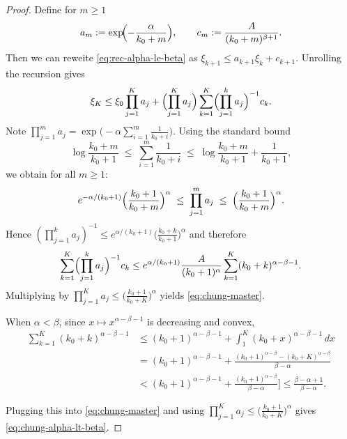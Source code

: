     \begin{proof}
    Define for $m\ge 1$
    \[
    a_m:=\exp\!\Bigl(-\frac{\alpha}{k_0+m}\Bigr),
    \qquad
    c_m:=\frac{A}{(k_0+m)^{\beta+1}}.
    \]
    Then we can reweite \eqref{eq:rec-alpha-le-beta} as $\xi_{k+1}\le a_{k+1}\xi_k+c_{k+1}$.
    Unrolling the recursion gives
    \[
    \xi_K
    \le
    \xi_0\prod_{j=1}^K a_j
    +
    \Bigl(\prod_{j=1}^K a_j\Bigr)\sum_{k=1}^K
    \Bigl(\prod_{j=1}^k a_j\Bigr)^{-1}c_k.
    \]
    Note $\prod_{j=1}^m a_j=\exp\!\bigl(-\alpha\sum_{i=1}^m\frac{1}{k_0+i}\bigr)$. Using the standard bound
    \[
    \log\frac{k_0+m}{k_0+1}
    \;\le\;
    \sum_{i=1}^m\frac{1}{k_0+i}
    \;\le\;
    \log\frac{k_0+m}{k_0+1}+\frac{1}{k_0+1},
    \]
    we obtain for all $m\ge 1$:
    \[
    e^{-\alpha/(k_0+1)}\Bigl(\frac{k_0+1}{k_0+m}\Bigr)^{\alpha}
    \;\le\;
    \prod_{j=1}^m a_j
    \;\le\;
    \Bigl(\frac{k_0+1}{k_0+m}\Bigr)^{\alpha}.
    \]
    Hence $(\prod_{j=1}^k a_j)^{-1}\le e^{\alpha/(k_0+1)}\bigl(\frac{k_0+k}{k_0+1}\bigr)^{\alpha}$ and therefore
    \[
    \sum_{k=1}^K\Bigl(\prod_{j=1}^k a_j\Bigr)^{-1}c_k
    \le
    e^{\alpha/(k_0+1)}\frac{A}{(k_0+1)^{\alpha}}
    \sum_{k=1}^K (k_0+k)^{\alpha-\beta-1}.
    \]
    Multiplying by $\prod_{j=1}^K a_j\le \bigl(\frac{k_0+1}{k_0+K}\bigr)^{\alpha}$ yields \eqref{eq:chung-master}.
    
    
    
    When $\alpha<\beta$, since $x\mapsto x^{\alpha-\beta-1}$ is decreasing and convex,
    \begin{align*}
        \sum_{k=1}^K (k_0+k)^{\alpha-\beta-1}
        &\le
        (k_0+1)^{\alpha-\beta-1}+\int_{1}^{K}(k_0+x)^{\alpha-\beta-1}\,dx \\
        &=(k_0+1)^{\alpha-\beta-1}+
        \frac{(k_0+1)^{\alpha-\beta}-(k_0+K)^{\alpha-\beta}}{\beta-\alpha} \\
        &<
        (k_0+1)^{\alpha-\beta-1}+
        \frac{(k_0+1)^{\alpha-\beta}}{\beta-\alpha}]\leq\frac{\beta-\alpha+1}{\beta-\alpha}.
    \end{align*}
    
    Plugging this into \eqref{eq:chung-master} and using $\prod_{j=1}^K a_j\le \bigl(\frac{k_0+1}{k_0+K}\bigr)^\alpha$
    gives \eqref{eq:chung-alpha-lt-beta}.
    \end{proof}
    

